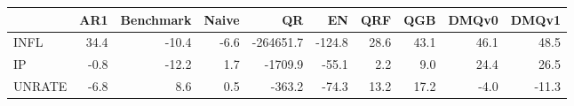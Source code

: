 \begin{tabular}{lrrrrrrrrr}
\toprule
 & AR1 & Benchmark & Naive & QR & EN & QRF & QGB & DMQv0 & DMQv1 \\
\midrule
INFL & 34.4 & -10.4 & -6.6 & -264651.7 & -124.8 & 28.6 & 43.1 & 46.1 & 48.5 \\
IP & -0.8 & -12.2 & 1.7 & -1709.9 & -55.1 & 2.2 & 9.0 & 24.4 & 26.5 \\
UNRATE & -6.8 & 8.6 & 0.5 & -363.2 & -74.3 & 13.2 & 17.2 & -4.0 & -11.3 \\
\bottomrule
\end{tabular}
